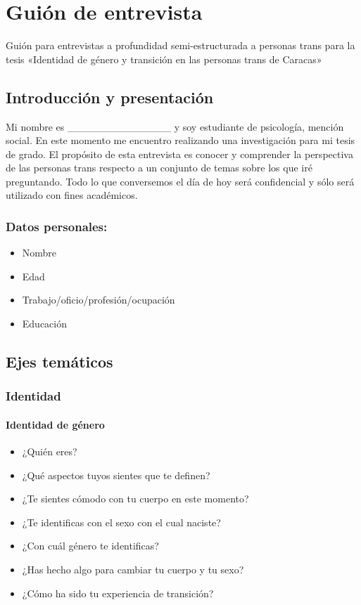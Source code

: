 \chapter{Guión de entrevista}\label{guion}

Guión para entrevistas a profundidad semi-estructurada a personas trans
para la tesis «Identidad de género y transición en las personas trans de
Caracas»

\section{Introducción y presentación}

Mi nombre es \_\_\_\_\_\_\_\_\_\_\_\_\_\_ y soy estudiante de psicología,
mención social. En este momento me encuentro realizando una investigación
para mi tesis de grado.
El propósito de esta entrevista es conocer y comprender la perspectiva de
las personas trans respecto a un conjunto de temas sobre los que
iré preguntando.
Todo lo que conversemos el día de hoy será confidencial y sólo será utilizado
con fines académicos.

\subsection{Datos personales:}

\begin{itemize}
\item
  Nombre
\item
  Edad
\item
  Trabajo/oficio/profesión/ocupación
\item
  Educación
\end{itemize}

\section{Ejes temáticos}

	\subsection{Identidad}
	
		\subsubsection{Identidad de género}

\begin{itemize}
\item
  ¿Quién eres?
\item
  ¿Qué aspectos tuyos sientes que te definen?
\item
  ¿Te sientes cómodo con tu cuerpo en este momento?
\item
  ¿Te identificas con el sexo con el cual naciste?
\item
  ¿Con cuál género te identificas?
\item
  ¿Has hecho algo para cambiar tu cuerpo y tu sexo?
\item
  ¿Cómo ha sido tu experiencia de transición?
\end{itemize}

